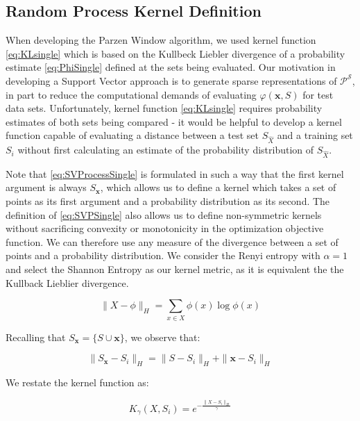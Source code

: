 \documentclass[10pt]{article}
\begin{document}
\subsection{  Random Process Kernel Definition }

When developing the Parzen Window algorithm, we used kernel function \ref{eq:KLsingle} which is based on the Kullbeck Liebler divergence of a probability estimate \ref{eq:PhiSingle} defined at the sets being evaluated.  Our motivation in developing a Support Vector approach is to generate sparse representations of \( \mathcal{P}^{\mathcal{S}} \), in part to reduce the computational demands of evaluating \( \varphi( \mathbf{x}, S) \) for test data sets.  Unfortunately, kernel function \ref{eq:KLsingle} requires probability estimates of both sets being compared - it would be helpful to develop a kernel function capable of evaluating a distance between a test set \( S_{\hat{X}} \) and a training set \( S_i \) without first calculating an estimate of the probability distribution of \( S_{\hat{X}} \).

Note that \ref{eq:SVProcessSingle} is formulated in such a way that the first kernel argument is always \( S_{\mathbf{x}} \), which allows us to define a kernel which takes a set of points as its first argument and a probability distribution as its second.  The definition of \ref{eq:SVPSingle} also allows us to define non-symmetric kernels without sacrificing convexity or monotonicity in the optimization objective function.  We can therefore use any measure of the divergence between a set of points and a probability distribution.  We consider the Renyi entropy with \( \alpha = 1 \) and select the Shannon Entropy as our kernel metric, as it is equivalent the the Kullback Lieblier divergence.

\begin{equation}
\| X - \phi \|_{H} = \sum_{x \in X} \phi(x) \log \phi(x)
\end{equation}

Recalling that \( S_\mathbf{x} = \{ S \cup \mathbf{x} \} \), we observe that:

\begin{equation}
\| S_{\mathbf{x}} - S_i \|_{H} = \| S - S_i \|_{H} + \| \mathbf{x} - S_i \|_{H}
\end{equation}

We restate the kernel function as:

\begin{equation}
K_\gamma( X, S_i ) = e^{ -\frac{ \| X - S_i \|_{H} }{ \gamma } }
\end{equation}
\end{document}
